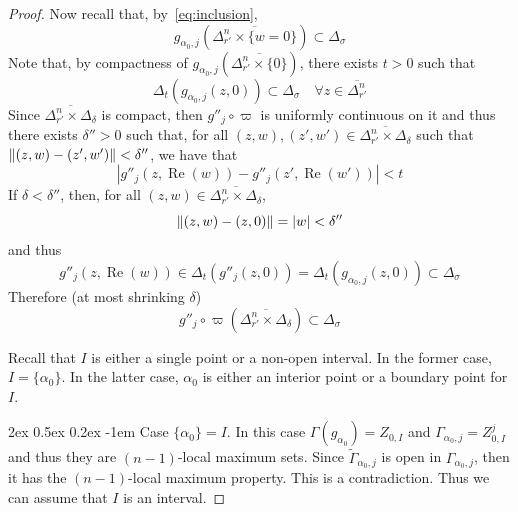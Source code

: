\documentclass[reqno,oneside]{amsart}
\makeatletter
\DeclarePairedDelimiter{\norm}{\lVert}{\rVert}
\DeclareMathOperator{\Realpart}{Re}
\renewcommand{\Re}{\Realpart}
\theoremstyle{definition}
\theoremstyle{plain}
\theoremstyle{remark}
\renewcommand{\paragraph}{
		\@startsection{paragraph}{4}
		{\z@}
		{2ex \@plus 0.5ex \@minus 0.2ex}
		{-1em}
		{\normalfont\bfseries}
	}
\makeatother
\begin{document}
\begin{proof}
    Now recall that, by~\eqref{eq:inclusion},
    \[
        g_{\alpha_0,j}(\overline{\Delta_{r'}^n\times\{w=0\}})\subset\Delta_\sigma
    \]
    Note that, by compactness of $g_{\alpha_0,j}(\overline{\Delta^n_{r'}\times\{0\}})$, there exists $t>0$ such that
    \[
        \Delta_t(g_{\alpha_0,j}(z,0))\subset\Delta_\sigma \quad \forall z\in\overline{\Delta^n_{r'}}
    \]
    Since $\overline{\Delta^n_{r'}\times\Delta_\delta}$ is compact, then $g''_j\circ\varpi$ is uniformly continuous on it and thus there exists $\delta''>0$ such that, for all $(z,w),(z',w')\in\overline{\Delta^n_{r'}\times\Delta_\delta}$ such that $\norm{(z,w)-(z',w')}<\delta''$, we have that
    \[
        |g''_j(z,\Re(w))-g''_j(z',\Re(w'))|<t
    \]
    If $\delta<\delta''$, then, for all $(z,w)\in\overline{\Delta^n_{r'}\times\Delta_\delta}$,
    \[
        \norm{(z,w)-(z,0)}=|w|<\delta''
    \]
    and thus
    \[
        g''_j(z,\Re(w))\in\Delta_t(g''_j(z,0))=\Delta_t(g_{\alpha_0,j}(z,0))\subset\Delta_\sigma
    \]
    Therefore (at most shrinking $\delta$)
    \begin{equation}
    \label{eq:localsubset}
        g''_j\circ\varpi(\overline{\Delta_{r'}^n\times\Delta_\delta})\subset\Delta_\sigma
    \end{equation}
    
    Recall that $I$ is either a single point or a non-open interval. In the former case, $I=\{\alpha_0\}$. In the latter case, $\alpha_0$ is either an interior point or a boundary point for $I$.

	\paragraph{Case {\boldmath $\{\alpha_0\}=I$}.} In this case $\Gamma(g_{\alpha_0})=Z_{0,I}$ and $\Gamma_{\alpha_0,j}=Z_{0,I}^j$ and thus they are $(n-1)$-local maximum sets. Since $\tilde\Gamma_{\alpha_0,j}$ is open in $\Gamma_{\alpha_0,j}$, then it has the $(n-1)$-local maximum property. This is a contradiction. Thus we can assume that $I$ is an interval.


\end{proof}
\end{document}
